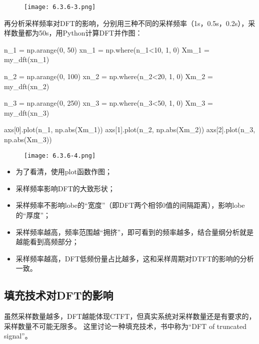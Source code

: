 \begin{figure}[ht]
\centering
\texttt{[image: 6.3.6-3.png]}
\end{figure}

再分析采样频率对DFT的影响，分别用三种不同的采样频率（1s，0.5s，0.2s），采样数量都为50s，用Python计算DFT并作图：

\begin{python}
n_1  = np.arange(0, 50)
xn_1 = np.where(n_1<10, 1, 0)
Xm_1 = my_dft(xn_1)

n_2  = np.arange(0, 100)
xn_2 = np.where(n_2<20, 1, 0)
Xm_2 = my_dft(xn_2)

n_3  = np.arange(0, 250)
xn_3 = np.where(n_3<50, 1, 0)
Xm_3 = my_dft(xn_3)

axs[0].plot(n_1, np.abs(Xm_1))
axs[1].plot(n_2, np.abs(Xm_2))
axs[2].plot(n_3, np.abs(Xm_3))
\end{python}

\begin{figure}[h]
\centering
\texttt{[image: 6.3.6-4.png]}
\end{figure}

\begin{itemize}
    \item 为了看清，使用plot函数作图；
    \item 采样频率影响DFT的大致形状；
    \item 采样频率不影响lobe的“宽度”（即DFT两个相邻0值的间隔距离），影响lobe的“厚度”；
    \item 采样频率越高，频率范围越“拥挤”，即可看到的频率越多，结合量纲分析就是越能看到高频部分；
    \item 采样频率越高，DFT低频份量占比越多，这和采样周期对DTFT的影响的分析一致。
\end{itemize}

\subsection{填充技术对DFT的影响}

虽然采样数量越多，DFT越能体现CTFT，但真实系统对采样数量还是有要求的，采样数量不可能无限多。
这里讨论一种填充技术，书中称为“DFT of truncated signal”。

